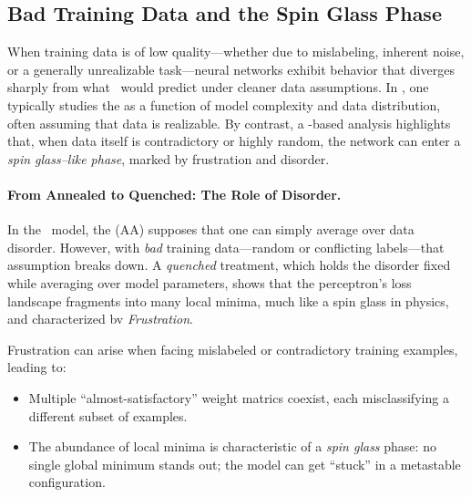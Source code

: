 \subsection{Bad Training Data and the Spin Glass Phase}
\label{sxn:SMOG_main-spin_glass}

When training data is of low quality---whether due to mislabeling, inherent noise, or a generally unrealizable task---neural networks exhibit behavior that diverges sharply from what \SLT\ would predict under cleaner data assumptions. In \SLT, one typically studies the \GeneralizationError as a function of model complexity and data distribution, often assuming that data is realizable. By contrast, a \STATMECH-based analysis highlights that, when data itself is contradictory or highly random, the network can enter a \emph{spin glass--like phase}, marked by frustration and disorder.

\paragraph{From Annealed to Quenched: The Role of Disorder.}
In the \StudentTeacher\ model, the \AnnealedApproximation (AA) supposes that one can simply average over data disorder. However, with \emph{bad} training data---random or conflicting labels---that assumption breaks down. A \emph{quenched} treatment, which holds the disorder fixed while averaging over model parameters, shows that the perceptron's loss landscape fragments into many local minima, much like a spin glass in physics, and characterized bv \emph{Frustration}.

Frustration can arise when facing mislabeled or contradictory training examples, leading to:
\begin{itemize}
\item Multiple ``almost-satisfactory'' weight matrics coexist, each misclassifying a different subset of examples.
\item The abundance of local minima is characteristic of a \emph{spin glass} phase: no single global minimum stands out; the model can get ``stuck'' in a metastable configuration.
\end{itemize}

